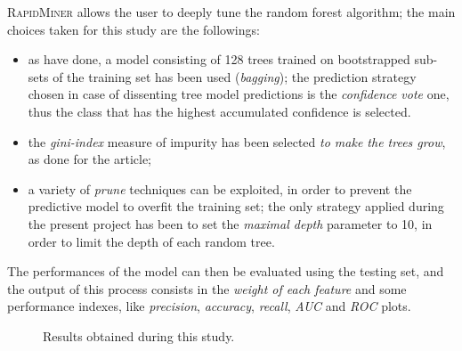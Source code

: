 \documentclass[a4paper]{article}
\begin{document}
	 		\textsc{RapidMiner} allows the user to deeply tune the random forest algorithm; the main choices taken for this study are the followings:
	 		\begin{itemize}
	 			\item as \citeauthor{article:muller} have done, a model consisting of 128 trees trained on bootstrapped sub-sets of the training set has been used (\emph{bagging}); the prediction strategy chosen in case of dissenting tree model predictions is the \emph{confidence vote} one, thus the class that has the highest accumulated confidence is selected.
	 			\item the \emph{gini-index} measure of impurity has been selected \emph{to make the trees grow}, as done for the article;
	 			\item a variety of \emph{prune} techniques can be exploited, in order to prevent the predictive model to overfit the training set; the only strategy applied during the present project has been to set the \emph{maximal depth} parameter to 10, in order to limit the depth of each random tree.
	 		\end{itemize}
 		
			The performances of the model can then be evaluated using the {testing set}, and the output of this process consists in the \emph{weight of each feature} and some performance indexes, like \emph{precision}, \emph{accuracy}, \emph{recall}, \emph{AUC} and \emph{ROC} plots.		
			
		\begin{figure}[p]
			\centering
			\quad
			\caption{Results obtained during this study.}
			\label{fig:muller_results}
		\end{figure}
		
\end{document}
